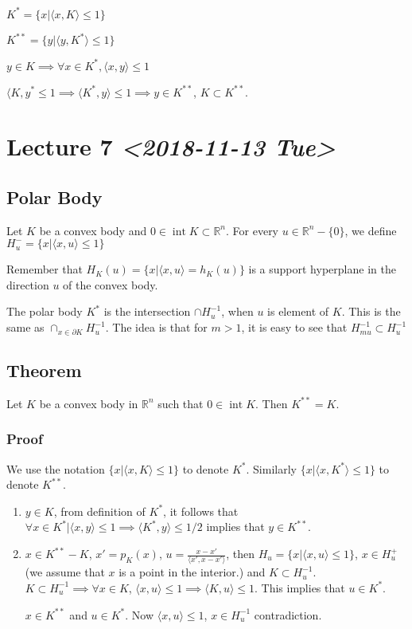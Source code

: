 \documentclass[11pt]{article}
\def\R{\mathbb{R}}
\def\inte{\operatorname{int}}
\begin{document}
\(K^{*} = \{x \vert \langle x, K \rangle \le 1\}\)

\(K^{**} = \{y \vert \langle y, K^{*} \rangle \le 1\}\)

\(y \in K \implies \forall x \in K^*, \langle x, y \rangle \le 1\)

\(\langle K, y^{*} \le 1 \implies \langle K^{*}, y\rangle \le 1 \implies y
    \in K^{**}\), \(K \subset K^{**}\).
\section{Lecture 7 \textit{<2018-11-13 Tue>}}
\label{sec:orga815aeb}
\subsection{Polar Body}
\label{sec:org64e4372}
Let \(K\) be a convex body and \(0\in \inte K \subset \R^n\). For every \(u\in
   \R^n - \{0\}\), we define \(H_u^{-} = \{x \vert \langle x, u \rangle \le 1\}\)

Remember that \(H_K(u) = \{x \vert \langle x, u \rangle = h_K(u)\}\) is a
support hyperplane in the direction \(u\) of the convex body.

The polar body \(K^{*}\) is the intersection \(\cap H^{-1}_u\), when \(u\) is
element of \(K\). This is the same as \(\cap_{x\in \partial K} H_u^{-1}\). The
idea is that for \(m>1\), it is easy to see that \(H^{-1}_{mu} \subset H^{-1}_u\)
\subsection{Theorem}
\label{sec:orga7c607e}
Let \(K\) be a convex body in \(\R^n\) such that \(0 \in \inte K\). Then \(K^{**} =
   K\).
\subsubsection{Proof}
\label{sec:orged92d81}
We use the notation \(\{x \vert \langle x, K \rangle \le 1\}\) to denote
\(K^{*}\). Similarly \(\{x \vert \langle x, K^{*} \rangle \le 1 \}\) to denote
\(K^{**}\).
\begin{enumerate}
\item \(y\in K\), from definition of \(K^{*}\), it follows that \(\forall x \in
       K^{*} \vert \langle x, y \rangle \le 1 \implies \langle K^{*}, y\rangle
       \le 1/2\) implies that \(y \in K^{**}\).
\item \(x \in K^{**} - K\), \(x' = p_K(x)\), \(u = \frac{x - x'}{\langle x', x -
       x'\rangle}\), then \(H_u = \{x \vert \langle x, u \rangle \le 1 \}\), \(x \in
       H^{+}_u\) (we assume that \(x\) is a point in the interior.) and \(K \subset
       H^{-1}_u\). \(K \subset H_u^{-1} \implies \forall x \in K\), \(\langle x, u
       \rangle \le 1 \implies \langle K, u \rangle \le 1\). This implies that \(u
       \in K^{*}\).

\(x \in K^{**}\) and \(u\in K^{*}\). Now \(\langle x, u \rangle \le 1\), \(x\in
       H^{-1}_u\) contradiction.
\end{enumerate}
\end{document}
